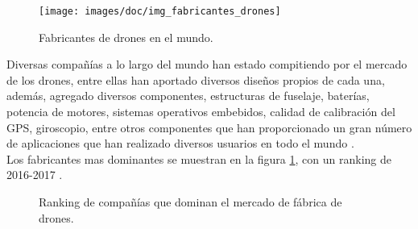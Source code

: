 \begin{figure}[H]
	\begin{center} 
		\texttt{[image: images/doc/img\_fabricantes\_drones]}
		\caption{Fabricantes de drones en el mundo.}
	\end{center}
\end{figure}

Diversas compañías a lo largo del mundo han estado compitiendo por el mercado de
los drones, entre ellas han aportado diversos diseños propios de cada una, 
además, agregado diversos componentes, estructuras de fuselaje, baterías, 
potencia de motores, sistemas operativos embebidos, calidad de calibración del 
GPS, giroscopio, entre otros componentes que han proporcionado un gran número de 
aplicaciones que han realizado diversos usuarios en todo el mundo 
\cite{x_drone_clasificacion}. \\

Los fabricantes mas dominantes se muestran en la figura \ref{grafica:fabricantes}, con un ranking de 2016-2017 \cite{drone_industry_insights, companias_dominantes_drones}.

\begin{figure}[H]
	
	\caption{Ranking de compañías que dominan el mercado de fábrica de drones.}
	\label{grafica:fabricantes}
\end{figure}
